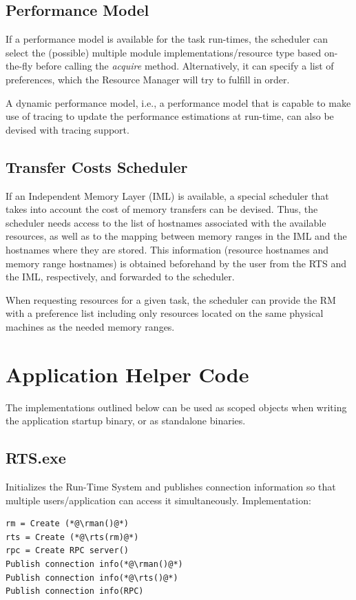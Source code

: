 \documentclass[10pt]{article}
\newcommand{\rts}{RTS\xspace}
\newcommand{\rman}{RM\xspace}
\newcommand{\iml}{IML\xspace}
\begin{document}
\subsection{Performance Model}
If a performance model is available for the task run-times, the scheduler can
select the (possible) multiple module implementations/resource type based
on-the-fly before calling the \emph{acquire} method. 
Alternatively, it can specify a list of preferences, which the Resource Manager
will try to fulfill in order. 

A dynamic performance model, i.e., a performance model that is capable to make
use of tracing to update the performance estimations at run-time, can also be
devised with tracing support. 

\subsection{Transfer Costs Scheduler}
If an Independent Memory Layer (IML) is available, a special scheduler that
takes into account the cost of memory transfers can be devised.
Thus, the scheduler needs access to the list of hostnames associated with the
available resources, as well as to the mapping between memory ranges in the IML
and the hostnames where they are stored. This information (resource hostnames 
and memory range hostnames) is obtained beforehand by the user from the \rts 
and the \iml, respectively, and forwarded to the scheduler.

When requesting resources for a given task, the scheduler can provide the RM
with a preference list including only resources located on the same physical
machines as the needed memory ranges.


\section{Application Helper Code}
The implementations outlined below can be used as scoped objects when writing 
the application startup binary, or as standalone binaries.

\subsection{RTS.exe}
Initializes the Run-Time System and publishes connection information so that 
multiple users/application can access it simultaneously.
Implementation:
\begin{lstlisting}
rm = Create (*@\rman()@*)
rts = Create (*@\rts(rm)@*)
rpc = Create RPC server()
Publish connection info(*@\rman()@*)
Publish connection info(*@\rts()@*)
Publish connection info(RPC)
\end{lstlisting}
\end{document}
